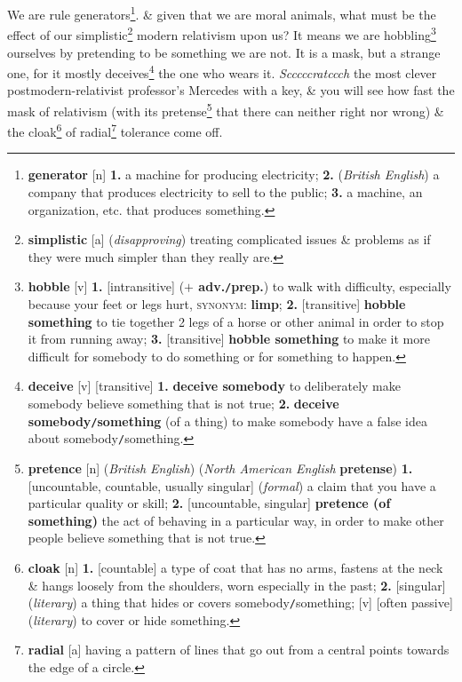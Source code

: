 \documentclass[oneside]{book}
\numberwithin{equation}{section}
\begin{document}
We are rule generators\footnote{\textbf{generator} [n] \textbf{1.} a machine for producing electricity; \textbf{2.} (\textit{British English}) a company that produces electricity to sell to the public; \textbf{3.} a machine, an organization, etc. that produces something.}. \& given that we are moral animals, what must be the effect of our simplistic\footnote{\textbf{simplistic} [a] (\textit{disapproving}) treating complicated issues \& problems as if they were much simpler than they really are.} modern relativism upon us? It means we are hobbling\footnote{\textbf{hobble} [v] \textbf{1.} [intransitive] (\textbf{$+$ adv.\texttt{/}prep.}) to walk with difficulty, especially because your feet or legs hurt, \textsc{synonym}: \textbf{limp}; \textbf{2.} [transitive] \textbf{hobble something} to tie together 2 legs of a horse or other animal in order to stop it from running away; \textbf{3.} [transitive] \textbf{hobble something} to make it more difficult for somebody to do something or for something to happen.} ourselves by pretending to be something we are not. It is a mask, but a strange one, for it mostly deceives\footnote{\textbf{deceive} [v] [transitive] \textbf{1.} \textbf{deceive somebody} to deliberately make somebody believe something that is not true; \textbf{2.} \textbf{deceive somebody\texttt{/}something} (of a thing) to make somebody have a false idea about somebody\texttt{/}something.} the one who wears it. \textit{Scccccratccch} the most clever postmodern-relativist professor's Mercedes with a key, \& you will see how fast the mask of relativism (with its pretense\footnote{\textbf{pretence} [n] (\textit{British English}) (\textit{North American English} \textbf{pretense}) \textbf{1.} [uncountable, countable, usually singular] (\textit{formal}) a claim that you have a particular quality or skill; \textbf{2.} [uncountable, singular] \textbf{pretence (of something)} the act of behaving in a particular way, in order to make other people believe something that is not true.} that there can neither right nor wrong) \& the cloak\footnote{\textbf{cloak} [n] \textbf{1.} [countable] a type of coat that has no arms, fastens at the neck \& hangs loosely from the shoulders, worn especially in the past; \textbf{2.} [singular] (\textit{literary}) a thing that hides or covers somebody\texttt{/}something; [v] [often passive] (\textit{literary}) to cover or hide something.} of radial\footnote{\textbf{radial} [a] having a pattern of lines that go out from a central points towards the edge of a circle.} tolerance come off.
\end{document}
